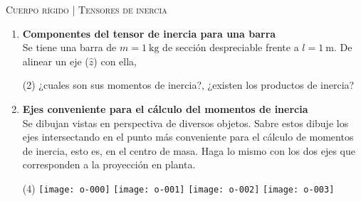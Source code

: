 \documentclass[11pt, spanish, a4paper, twoside]{article}
\begin{document}
\begin{center}
  \textsc{\large Cuerpo rígido | Tensores de inercia}
\end{center}


\begin{enumerate}



	\item
	\textbf{Componentes del tensor de inercia para una barra}\\
	Se tiene una barra de \(m= \SI{1}{\kilo\gram}\) de sección despreciable frente a \(l= \SI{1}{\metre}\).
	De alinear un eje (\(\hat{z}\)) con ella, 
	\begin{tasks}(2)
		\task	¿cuales son sus momentos de inercia?,
		\task ¿existen los productos de inercia? 
	\end{tasks}


	\item
	\textbf{Ejes conveniente para el cálculo del momentos de inercia}\\
	Se dibujan vistas en perspectiva de diversos objetos.
	Sabre estos dibuje los ejes intersectando en el punto más conveniente para el cálculo de momentos de inercia, esto es, en el centro de masa.
	Haga lo mismo con los dos ejes que corresponden a la proyección en planta.
	\vspace{-0.8cm}
	\begin{tasks}(4)
		\task \texttt{[image: o-000]}
		\task \texttt{[image: o-001]}
		\task \texttt{[image: o-002]}
		\task \texttt{[image: o-003]}
	\end{tasks}




\end{enumerate}
\end{document}
